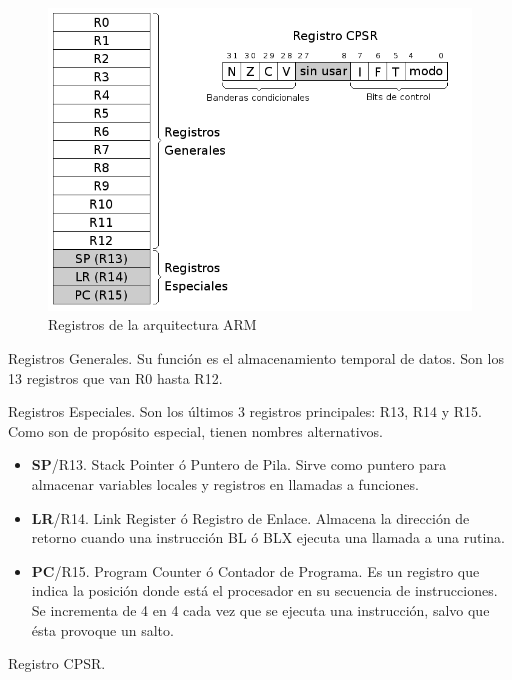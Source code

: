 \begin{figure}[h]
  \centering
    \includegraphics[width=14cm]{graphs/registros.png}
  \caption{Registros de la arquitectura ARM}
  \label{fig:reg_arm}
\end{figure}

\begin{descript}
  \item[Registros Generales.]
    Su función es el almacenamiento temporal de datos. Son los 13 registros
    que van R0 hasta R12.
  \item[Registros Especiales.]{
    Son los últimos 3 registros principales: R13, R14 y R15. Como son de
    propósito especial, tienen nombres alternativos.}

    \begin{itemize}
      \item{\textbf{SP}/R13. Stack Pointer ó Puntero de Pila. Sirve como puntero para almacenar
        variables locales y registros en llamadas a funciones.}
      \item{\textbf{LR}/R14. Link Register ó Registro de Enlace. Almacena la dirección de retorno
        cuando una instrucción BL ó BLX ejecuta una llamada a una rutina.}
      \item{\textbf{PC}/R15. Program Counter ó Contador de Programa. Es un registro que indica
        la posición donde está el procesador en su secuencia de instrucciones. Se
        incrementa de 4 en 4 cada vez que se ejecuta una instrucción, salvo que ésta
        provoque un salto.}
    \end{itemize}

  \item[Registro CPSR.]{}

\end{descript}

\chapterend{}


